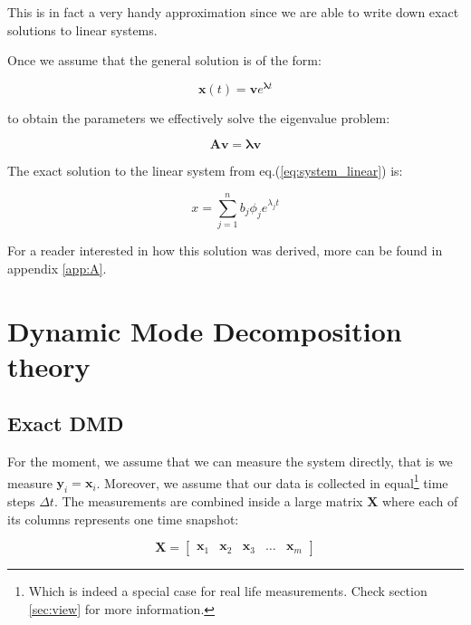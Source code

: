 \documentclass[10pt,twocolumn]{article}
\begin{document}
This is in fact a very handy approximation since we are able to write down exact solutions to linear systems.

Once we assume that the general solution is of the form:

\begin{equation} \label{eq:general_solution}
\mathbf{x}(t) = \mathbf{v} e^{\bm{\lambda} t}
\end{equation}

to obtain the parameters we effectively solve the eigenvalue problem:

\begin{equation} \label{eq:eigenvalue_solution}
\mathbf{A} \mathbf{v} = \bm{\lambda} \mathbf{v}
\end{equation}

The exact solution to the linear system from eq.(\ref{eq:system_linear}) is:

\begin{equation} \label{eq:soln_exact}
x = \sum_{j = 1}^{n} b_j \phi_j e^{\lambda_j t}
\end{equation}

For a reader interested in how this solution was derived, more can be found in appendix \ref{app:A}. 

\section{Dynamic Mode Decomposition theory}\label{sec:theory}

\subsection{Exact DMD}

For the moment, we assume that we can measure the system directly, that is we measure $\mathbf{y}_i = \mathbf{x}_i$. Moreover, we assume that our data is collected in equal\footnote{Which is indeed a special case for real life measurements. Check section \ref{sec:view} for more information.} time steps $\Delta t$. The measurements are combined inside a large matrix $\mathbf{X}$ where each of its columns represents one time snapshot:

\begin{equation} \label{eq:X}
\mathbf{X} = 
\begin{bmatrix}
    \mathbf{x}_1 & \mathbf{x}_2 & \mathbf{x}_3 & \dots & \mathbf{x}_{m}
\end{bmatrix}
\end{equation}
\end{document}
